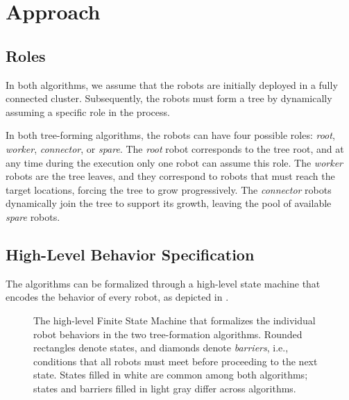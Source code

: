 \section{Approach}
\label{sec:approach}

\subsection{Roles}
\label{sec:roles}

In both algorithms, we assume that the robots are initially deployed
in a fully connected cluster. Subsequently, the robots must form a
tree by dynamically assuming a specific role in the process.

In both tree-forming algorithms, the robots can have four possible
roles: \emph{root}, \emph{worker}, \emph{connector}, or
\emph{spare}. The \emph{root} robot corresponds to the tree
root, and at any time during the execution only one robot can assume
this role. The \emph{worker} robots are the tree leaves, and they
correspond to robots that must reach the target locations, forcing the
tree to grow progressively. The \emph{connector} robots dynamically
join the tree to support its growth, leaving the pool of available
\emph{spare} robots.

\subsection{High-Level Behavior Specification}
\label{sec:behaviorspec}

The algorithms can be formalized through a high-level state machine
that encodes the behavior of every robot, as depicted in
.
\begin{figure}[t]
  \centering
  \caption{The high-level Finite State Machine that formalizes the
    individual robot behaviors in the two tree-formation
    algorithms. Rounded rectangles denote states, and diamonds denote
    \emph{barriers}, i.e., conditions that all robots must meet before
    proceeding to the next state. States filled in white are common
    among both algorithms; states and barriers filled in light gray
    differ across algorithms.}
  \label{fig:generalfsm}
\end{figure}

